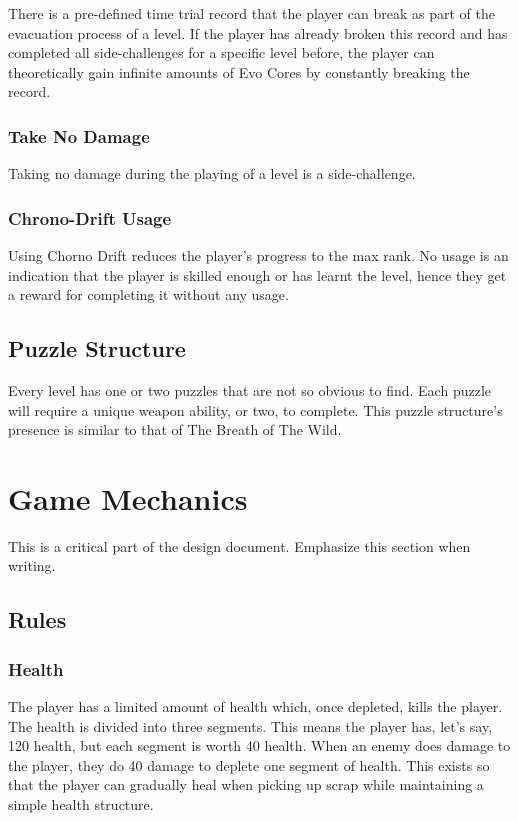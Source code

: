 \documentclass[12pt]{article}
\begin{document}
There is a pre-defined time trial record that the player can break as part of the evacuation process of a level. If the player has already broken this record and has completed all side-challenges for a specific level before, the player can theoretically gain infinite amounts of Evo Cores by constantly breaking the record. 

\subsubsection{Take No Damage}

Taking no damage during the playing of a level is a side-challenge. 

\subsubsection{Chrono-Drift Usage}

Using Chorno Drift reduces the player's progress to the max rank. No usage is an indication that the player is skilled enough or has learnt the level, hence they get a reward for completing it without any usage. 

\subsection{Puzzle Structure}

Every level has one or two puzzles that are not so obvious to find. Each puzzle will require a unique weapon ability, or two, to complete. This puzzle structure's presence is similar to that of The Breath of The Wild. 

\section{Game Mechanics}

This is a critical part of the design document. Emphasize this section when writing.

\subsection{Rules}

\subsubsection{Health}

The player has a limited amount of health which, once depleted, kills the player. The health is divided into three segments. This means the player has, let's say, 120 health, but each segment is worth 40 health. When an enemy does damage to the player, they do 40 damage to deplete one segment of health. This exists so that the player can gradually heal when picking up scrap while maintaining a simple health structure. 
\end{document}
